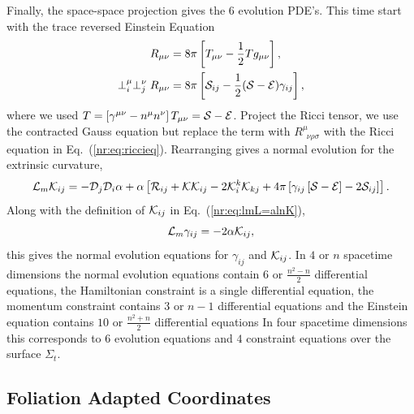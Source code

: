 Finally, the space-space projection gives the 6 evolution PDE's. This time start with the trace reversed Einstein Equation
\begin{align} R_{\mu\nu} &= 8 \pi \left[T_{\mu\nu} - \frac{1}{2}Tg_{\mu\nu}\right],\\
\perp^\mu_i\perp^\nu_jR_{\mu\nu} &= 8 \pi \left[\mathcal{S}_{ij} - \frac{1}{2}(\mathcal{S}-\mathcal{E})\gamma_{ij}\right],
\end{align}
where we used $T = \left[ \gamma^{\mu\nu} - n^\mu n^\nu\right]T_{\mu\nu} = \mathcal{S}-\mathcal{E}$. Project the Ricci tensor, we use the contracted Gauss equation but replace the term with $R^\mu_{\,\,\,\nu\rho\sigma}$ with the Ricci equation in Eq.~(\ref{nr:eq:riccieq}). Rearranging gives a normal evolution for the extrinsic curvature,
\begin{equation} \mathcal{L}_m \mathcal{K}_{ij} = -\mathcal{D}_j\mathcal{D}_i \alpha + \alpha \left[ \mathcal{R}_{ij} + \mathcal{K}\mathcal{K}_{ij} - 2\mathcal{K}^k_i\mathcal{K}_{kj} + 4\pi \left[ \gamma_{ij}\left[ \mathcal{S}-\mathcal{E}\right]-2\mathcal{S}_{ij}\right]\right].\end{equation}
Along with the definition of $\mathcal{K}_{ij}$ in Eq.~(\ref{nr:eq:lmL=alnK}), 
\begin{equation} \label{nr:eq:Lmgamma}
\mathcal{L}_m \gamma_{ij} = -2\alpha \mathcal{K}_{ij},
\end{equation}
this gives the normal evolution equations for $\gamma_{ij}$ and $\mathcal{K}_{ij}$. In $4$ or $n$ spacetime dimensions the normal evolution equations contain $6$ or $\frac{n^2-n}{2}$ differential equations, the Hamiltonian constraint is a single differential equation, the momentum constraint contains $3$ or $n-1$ differential equations and the Einstein equation contains $10$ or $\frac{n^2+n}{2}$ differential equations In four spacetime dimensions this corresponds to $6$ evolution equations and $4$ constraint equations over the surface $\Sigma_t$.

\subsection{Foliation Adapted Coordinates}

